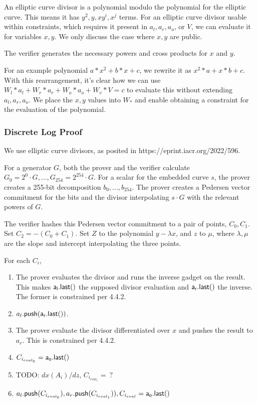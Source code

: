 \documentclass[]{article}
\begin{document}
An elliptic curve divisor is a polynomial modulo the polynomial for the elliptic curve. This means it has $y^2, y, xy^i, x^j$ terms. For an elliptic curve divisor usable within constraints, which requires it present in $a_l, a_r, a_o$, or $V$, we can evaluate it for variables $x, y$. We only discuss the case where $x, y$ are public.

The verifier generates the necessary powers and cross products for $x$ and $y$.

For an example polynomial $a * x^2 + b * x + c$, we rewrite it as $x^2 * a + x * b + c$. With this rearrangement, it's clear how we can use $W_l * a_l + W_r * a_r + W_o * a_o + W_v * V = c$ to evaluate this without extending $a_l, a_r, a_o$. We place the $x, y$ values into $W_*$ and enable obtaining a constraint for the evaluation of the polynomial.

\subsubsection{Discrete Log Proof}

We use elliptic curve divisors, as posited in https://eprint.iacr.org/2022/596.

For a generator $G$, both the prover and the verifier calculate $G_0 = 2^0 \cdot G, ...,G_{254} = 2^{254} \cdot G$. For a scalar for the embedded curve $s$, the prover creates a 255-bit decomposition $b_0, ..., b_{254}$. The prover creates a Pedersen vector commitment for the bits and the divisor interpolating $s \cdot G$ with the relevant powers of $G$.

The verifier hashes this Pedersen vector commitment to a pair of points, $C_0, C_1$. Set $C_2 = -(C_0 + C_1)$. Set $Z$ to the polynomial $y - \lambda x$, and $z$ to $\mu$, where $\lambda, \mu$ are the slope and intercept interpolating the three points.

For each $C_i$,

\begin{enumerate}
	\item The prover evaluates the divisor and runs the inverse gadget on the result. This makes $\mathsf{a_l.last()}$ the supposed divisor evaluation and $\mathsf{a_r.last()}$ the inverse. The former is constrained per 4.4.2.
	\item $a_l\mathsf{.push}(\mathsf{a_r.last()})$.
	\item The prover evaluate the divisor differentiated over $x$ and pushes the result to $a_r$. This is constrained per 4.4.2.
	\item $C_{i_{eval_0}} = \mathsf{a_o.last()}$
	\item TODO: $dx(A_i) / dz$, $C_{i_{eval_1}} = ~?$
	\item $a_l\mathsf{.push}(C_{i_{eval_0}}), a_r\mathsf{.push}(C_{i_{eval_1}})), C_{i_{eval}} = \mathsf{a_o.last()}$
\end{enumerate}
\end{document}
